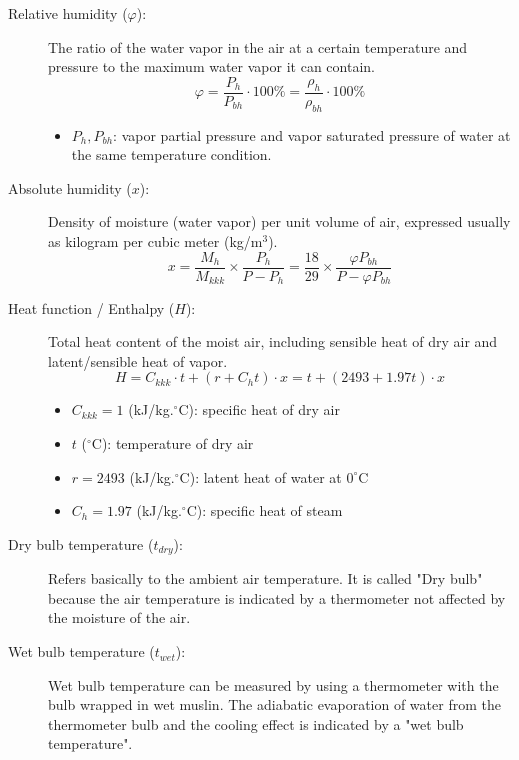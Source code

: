 \begin{description}
    \item[Relative humidity ($\varphi$):] The ratio of the water vapor in the air at a certain temperature and pressure to the maximum water vapor it can contain.
    \begin{equation*}
        \varphi = \frac{P_h}{P_{bh}} \cdot 100\% = \frac{\rho_h}{\rho_{bh}} \cdot 100\%
    \end{equation*}
    \begin{itemize}
        \item $P_h, P_{bh}$: vapor partial pressure and vapor saturated pressure of water at the same temperature condition.
    \end{itemize}
    
    \item[Absolute humidity ($x$):] Density of moisture (water vapor) per unit volume of air, expressed usually as kilogram per cubic meter (kg/m$^3$).
    \begin{equation*}
        x = \frac{M_h}{M_{kkk}} \times \frac{P_h}{P-P_h} = \frac{18}{29} \times \frac{\varphi P_{bh}}{P - \varphi P_{bh}}
    \end{equation*}

    \item[Heat function / Enthalpy ($H$):] Total heat content of the moist air, including sensible heat of dry air and latent/sensible heat of vapor.
    \begin{equation*}
        H = C_{kkk} \cdot t + (r + C_h t) \cdot x = t + (2493 + 1.97t) \cdot x
    \end{equation*}
    \begin{itemize}
        \item $C_{kkk} = 1$ (kJ/kg.$^\circ$C): specific heat of dry air
        \item $t$ ($^\circ$C): temperature of dry air
        \item $r = 2493$ (kJ/kg.$^\circ$C): latent heat of water at $0^\circ$C
        \item $C_h = 1.97$ (kJ/kg.$^\circ$C): specific heat of steam
    \end{itemize}

    \item[Dry bulb temperature ($t_{dry}$):] Refers basically to the ambient air temperature. It is called "Dry bulb" because the air temperature is indicated by a thermometer not affected by the moisture of the air.

    \item[Wet bulb temperature ($t_{wet}$):] Wet bulb temperature can be measured by using a thermometer with the bulb wrapped in wet muslin. The adiabatic evaporation of water from the thermometer bulb and the cooling effect is indicated by a "wet bulb temperature".


\end{description}
